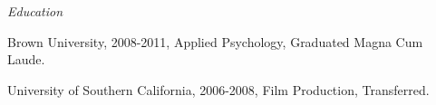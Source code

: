 \documentclass[12pt]{res}
\begin{document}
{\begin{resume}
\begin{list}{}{\leftmargin=1em}
{\begin{list}{-}{\leftmargin=1em}
\end{list}}
\item
\item{\centering \textit{Education}
\item 
\item
\begin{list}{-}{\leftmargin=1em}
\item Brown University, 2008-2011, Applied Psychology, Graduated Magna Cum Laude. 
\item University of Southern California, 2006-2008, Film Production, Transferred. 
\end{list}}
\item
\item
\end{list}

\end{resume}
} %
\end{document}
